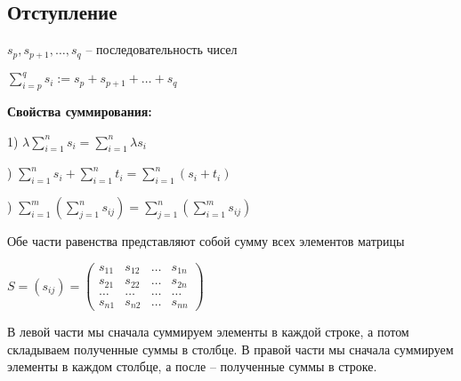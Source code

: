 \bigskip
\subsection{Отступление} 

$s_p, s_{p+1}, \dots, s_q$ -- последовательность чисел

$\sum\limits_{i=p}^q s_i := s_p + s_{p+1} + \dots + s_q$

\bigskip
\textbf{Свойства суммирования: }

1) $\lambda \sum\limits_{i=1}^n s_i = \sum\limits_{i=1}^n \lambda s_i$

) $\sum\limits_{i=1}^n s_i + \sum\limits_{i=1}^n t_i = \sum\limits_{i=1}^n (s_i + t_i)$

) $\sum\limits_{i=1}^m ( \sum\limits_{j=1}^n s_{ij}) = \sum\limits_{j=1}^n ( \sum\limits_{i=1}^m s_{ij})$

Обе части равенства представляют собой сумму всех элементов матрицы 

$S = (s_{ij}) = \begin{pmatrix} s_{11} & s_{12} & \dots & s_{1n} \\
s_{21} & s_{22} & \dots & s_{2n} \\
\dots & \dots & \dots & \dots \\
s_{n1} & s_{n2} & \dots & s_{nn} \end{pmatrix}$ 

\bigskip
В левой части мы сначала суммируем элементы в каждой строке, а потом складываем полученные суммы в столбце. В правой части мы сначала суммируем элементы в каждом столбце, а после -- полученные суммы в строке.

